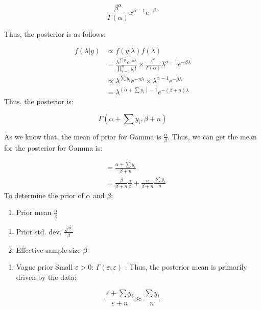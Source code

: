 \documentclass[]{book}
\providecommand{\tightlist}{%
  \setlength{\itemsep}{0pt}\setlength{\parskip}{0pt}}
\begin{document}
\[\frac{\beta^{\alpha}}{\Gamma(\alpha)}x^{\alpha-1}e^{-\beta x}\]

Thus, the posterior is as follows:

\[\begin{aligned} f(\lambda | y) &\propto f(y|\lambda)f(\lambda) \\ &=\frac{\lambda^{\sum y_i} e^{- n \lambda}}{\prod_{i=1}^n y_i !} \times \frac{\beta^{\alpha}}{\Gamma(\alpha)}\lambda^{\alpha-1}e^{-\beta \lambda} \\ &\propto \lambda^{\sum y_i}e^{- n \lambda} \times \lambda^{\alpha-1}e^{-\beta \lambda} \\ &=\lambda^{(\alpha+\sum y_i)-1}e^{- (\beta+n) \lambda} \end{aligned}\]
Thus, the posterior is:

\[\Gamma(\alpha + \sum y_i, \beta+n)\]

As we know that, the mean of prior for Gamma is \(\frac{\alpha}{\beta}\). Thus, we can get the mean for the posterior for Gamma is:

\[\begin{aligned} &=\frac{\alpha+\sum y_i}{\beta+n} \\ &= \frac{\beta}{\beta+n} \frac{\alpha}{\beta}+\frac{n}{\beta+n} \frac{\sum y_i}{n} \end{aligned}\]
To determine the prior of \(\alpha\) and \(\beta\):

\begin{enumerate}
\def\labelenumi{(\arabic{enumi})}
\tightlist
\item
  Prior mean \(\frac{\alpha}{\beta}\)
\end{enumerate}

\begin{enumerate}
\def\labelenumi{(\alph{enumi})}
\tightlist
\item
  Prior std. dev. \(\frac{\sqrt \alpha}{\beta}\)
\item
  Effective sample size \(\beta\)
\end{enumerate}

\begin{enumerate}
\def\labelenumi{(\arabic{enumi})}
\setcounter{enumi}{1}
\tightlist
\item
  Vague prior
  Small \(\varepsilon >0\): \(\Gamma (\varepsilon,\varepsilon)\) . Thus, the posterior mean is primarily driven by the data:
\end{enumerate}

\[\frac{\varepsilon + \sum y_i}{\varepsilon + n} \approx \frac{ \sum y_i}{n} \]
\end{document}
